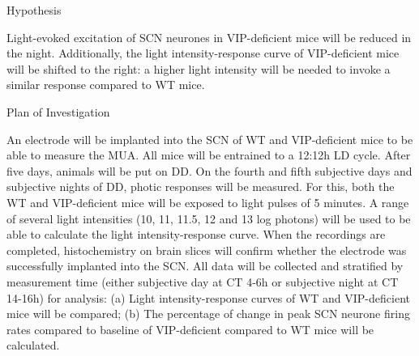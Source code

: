 \begin{multicols}{2}
Hypothesis

Light-evoked excitation of SCN neurones in VIP-deficient mice will be reduced in the night. Additionally, the light intensity-response curve of VIP-deficient mice will be shifted to the right: a higher light intensity will be needed to invoke a similar response compared to WT mice.

Plan of Investigation

An electrode will be implanted into the SCN of WT and VIP-deficient mice to be able to measure the MUA. All mice will be entrained to a 12:12h LD cycle. After five days, animals will be put on DD. On the fourth and fifth subjective days and subjective nights of DD, photic responses will be measured. For this, both the WT and VIP-deficient mice will be exposed to light pulses of 5 minutes. A range of several light intensities (10, 11, 11.5, 12 and 13 log photons) will be used to be able to calculate the light intensity-response curve. When the recordings are completed, histochemistry on brain slices will confirm whether the electrode was successfully implanted into the SCN. All data will be collected and stratified by measurement time (either subjective day at CT 4-6h or subjective night at CT 14-16h) for analysis: (a) Light intensity-response curves of WT and VIP-deficient mice will be compared; (b) The percentage of change in peak SCN neurone firing rates compared to baseline of VIP-deficient compared to WT mice will be calculated.



%
%


%



\end{multicols}
